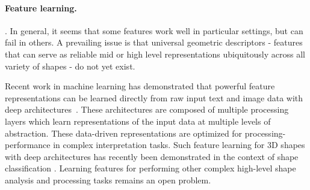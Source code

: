 \paragraph*{Feature learning.}
. In general, it seems that some features work well in particular settings, but can fail in others.  A prevailing issue is that universal geometric descriptors - features that can serve as reliable mid or high level representations ubiquitously across all variety of shapes - do not yet exist.

 Recent work in machine learning has demonstrated that powerful feature representations can be learned directly from raw input text and image data with deep architectures~\cite{Hinton:DBN:2006,Krizhevsky:ICDL:2012,zeiler:vis:2014}. These architectures are composed of multiple processing layers which learn representations of the input data at multiple levels of abstraction. These data-driven representations are optimized for processing-performance in complex interpretation tasks. Such feature learning for 3D shapes with deep architectures has recently been demonstrated in the context of shape classification \cite{Wu:3SN:2015,Su:MCN:2015,Xie:PFL:2015,Huang:2015:AS3}.
Learning features for performing other complex high-level shape analysis and processing tasks remains an open problem.

















